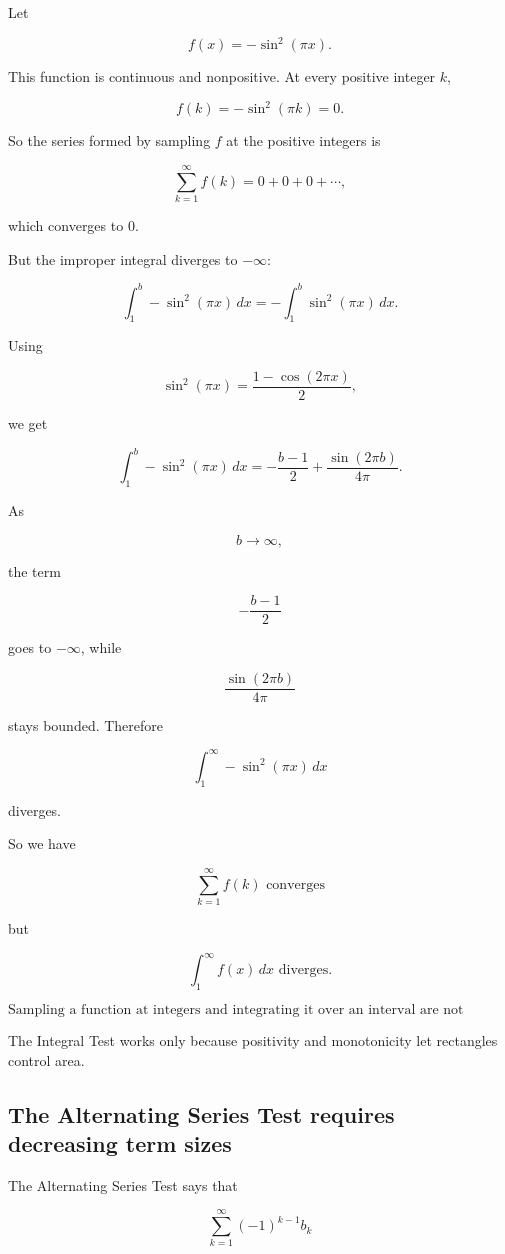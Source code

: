 Let

\[
f(x)=-\sin^2(\pi x).
\]

This function is continuous and nonpositive.  At every positive integer \(k\),

\[
f(k)=-\sin^2(\pi k)=0.
\]

So the series formed by sampling \(f\) at the positive integers is

\[
\sum_{k=1}^{\infty}f(k)
=
0+0+0+\cdots,
\]

which converges to \(0\).

But the improper integral diverges to \(-\infty\):

\[
\int_1^b -\sin^2(\pi x)\,dx
=
-\int_1^b \sin^2(\pi x)\,dx.
\]

Using

\[
\sin^2(\pi x)=\frac{1-\cos(2\pi x)}{2},
\]

we get

\[
\int_1^b -\sin^2(\pi x)\,dx
=
-\frac{b-1}{2}
+
\frac{\sin(2\pi b)}{4\pi}.
\]

As

\[
b\to\infty,
\]

the term

\[
-\frac{b-1}{2}
\]

goes to \(-\infty\), while

\[
\frac{\sin(2\pi b)}{4\pi}
\]

stays bounded.  Therefore

\[
\int_1^\infty -\sin^2(\pi x)\,dx
\]

diverges.

So we have

\[
\sum_{k=1}^{\infty}f(k) \text{ converges}
\]

but

\[
\int_1^\infty f(x)\,dx \text{ diverges}.
\]

\[
\boxed{
\text{Sampling a function at integers and integrating it over an interval are not automatically equivalent.}
}
\]

The Integral Test works only because positivity and monotonicity let rectangles control
area.

\subsection{The Alternating Series Test requires decreasing term sizes}
\label{subsec:warning-alternating-test-decreasing}

The Alternating Series Test says that

\[
\sum_{k=1}^{\infty}(-1)^{k-1}b_k
\]

